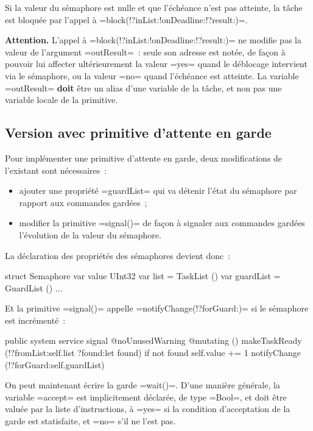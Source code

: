 Si la valeur du sémaphore est nulle et que l'échéance n'est pas atteinte, la tâche est bloquée par l'appel à \omnibus=block(!?inList:!onDeadline:!?result:)=.

{\bf Attention.} L'appel à \omnibus=block(!?inList:!onDeadline:!?result:)= ne modifie pas la valeur de l'argument \omnibus=outResult=~: seule son adresse est notée, de façon à pouvoir lui affecter ultérieurement la valeur \omnibus=yes= quand le déblocage intervient via le sémaphore, ou la valeur \omnibus=no= quand l'échéance est atteinte. La variable \omnibus=outResult= {\bf doit} être un alias d'une variable de la tâche, et non pas une variable locale de la primitive.




\subsection{Version avec primitive d'attente en garde}

Pour implémenter une primitive d'attente en garde, deux modifications de l'existant sont nécessaires~:
\begin{itemize}
  \item ajouter une propriété \omnibus=guardList= qui va détenir l'état du sémaphore par rapport aux commandes gardées~;
  \item modifier la primitive \omnibus=signal()= de façon à signaler aux commandes gardées l'évolution de la valeur du sémaphore.
\end{itemize}

La déclaration des propriétés des sémaphores devient donc~:

\begin{OMNIBUS}
struct Semaphore {
  var value UInt32
  var list = TaskList ()
  var guardList = GuardList ()
  ...
}
\end{OMNIBUS}

Et la primitive \omnibus=signal()= appelle \omnibus=notifyChange(!?forGuard:)= si le sémaphore est incrémenté~:

\begin{OMNIBUS}
  public system service signal @noUnusedWarning @mutating () {
    makeTaskReady (!?fromList:self.list ?found:let found)
    if not found {
      self.value += 1
      notifyChange (!?forGuard:self.guardList)
    }
  }
\end{OMNIBUS}

On peut maintenant écrire la garde \omnibus=wait()=. D'une manière générale, la variable \omnibus=accept= est implicitement déclarée, de type \omnibus=Bool=, et doit être valuée par la liste d'instructions, à \omnibus=yes= si la condition d'acceptation de la garde est statisfaite, et \omnibus=no= s'il ne l'est pas.

